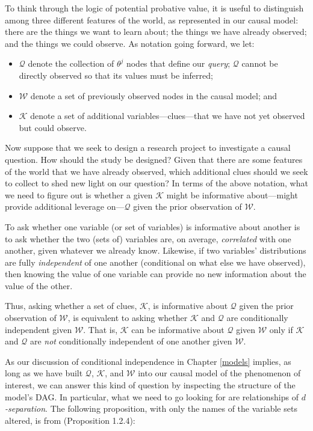 \documentclass[
  12pt,
]{book}
\providecommand{\tightlist}{%
  \setlength{\itemsep}{0pt}\setlength{\parskip}{0pt}}
\begin{document}
To think through the logic of potential probative value, it is useful to distinguish among three different features of the world, as represented in our causal model: there are the things we want to learn about; the things we have already observed; and the things we could observe. As notation going forward, we let:

\begin{itemize}
\tightlist
\item
  \(\mathcal Q\) denote the collection of \(\theta^j\) nodes that define our \emph{query}; \(\mathcal Q\) cannot be directly observed so that its values must be inferred;
\item
  \(\mathcal W\) denote a set of previously observed nodes in the causal model; and
\item
  \(\mathcal K\) denote a set of additional variables---clues---that we have not yet observed but could observe.
\end{itemize}

Now suppose that we seek to design a research project to investigate a causal question. How should the study be designed? Given that there are some features of the world that we have already observed, which additional clues should we seek to collect to shed new light on our question? In terms of the above notation, what we need to figure out is whether a given \(\mathcal K\) might be informative about---might provide additional leverage on---\(\mathcal Q\) given the prior observation of \(\mathcal W\).

To ask whether one variable (or set of variables) is informative about another is to ask whether the two (sets of) variables are, on average, \emph{correlated} with one another, given whatever we already know. Likewise, if two variables' distributions are fully \emph{independent} of one another (conditional on what else we have observed), then knowing the value of one variable can provide no new information about the value of the other.

Thus, asking whether a set of clues, \(\mathcal K\), is informative about \(\mathcal Q\) given the prior observation of \(\mathcal W\), is equivalent to asking whether \(\mathcal K\) and \(\mathcal Q\) are conditionally independent given \(\mathcal W\). That is, \(\mathcal K\) can be informative about \(\mathcal Q\) given \(\mathcal W\) only if \(\mathcal K\) and \(\mathcal Q\) are \emph{not} conditionally independent of one another given \(\mathcal W\).

As our discussion of conditional independence in Chapter \ref{models} implies, as long as we have built \(\mathcal Q\), \(\mathcal K\), and \(\mathcal W\) into our causal model of the phenomenon of interest, we can answer this kind of question by inspecting the structure of the model's DAG. In particular, what we need to go looking for are relationships of \emph{\(d\)-separation}. The following proposition, with only the names of the variable sets altered, is from \citet{pearl2009causality} (Proposition 1.2.4):
\end{document}
